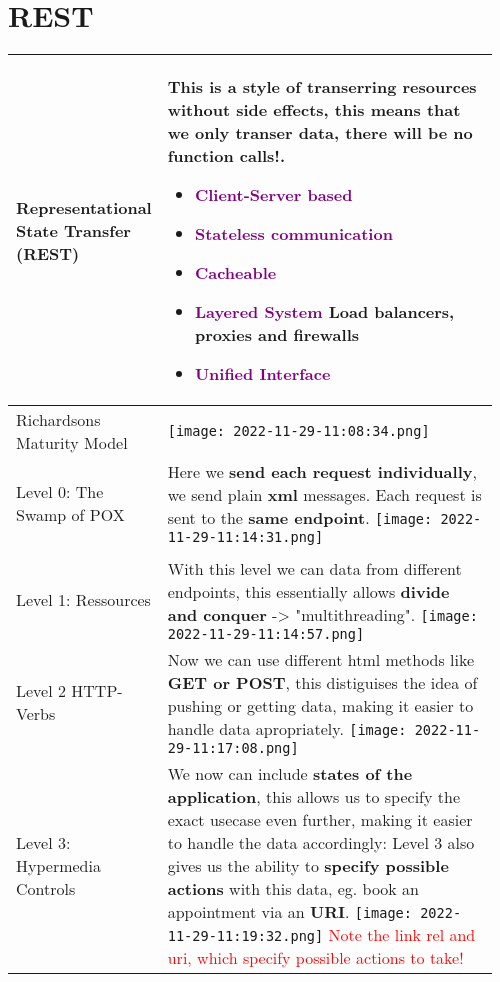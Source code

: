 \documentclass[main.tex,fontsize=8pt,paper=a4,paper=portrait,DIV=calc,]{scrartcl}
\begin{document}
\begin{table}[ht!]
\section{REST}
\begin{tabular}{|m{0.2\linewidth}|m{0.755\linewidth}|}
\hline
Representational State Transfer (REST) & 
This is a style of transerring resources without side effects, this means that \textbf{we only transer data, there will be no function calls!}.\newline
\begin{itemize}
\item \textcolor{purple}{Client-Server based}
\item \textcolor{purple}{Stateless communication}
\item \textcolor{purple}{Cacheable}
\item \textcolor{purple}{Layered System} Load balancers, proxies and firewalls
\item \textcolor{purple}{Unified Interface}
\vspace{-3mm}
\end{itemize} \\
\hline
Richardsons Maturity Model & 
\vspace{2mm}
\texttt{[image: 2022-11-29-11:08:34.png]}\\
\hline
Level 0: The Swamp of POX & 
Here we \textbf{send each request individually}, we send plain \textbf{xml} messages.\newline
Each request is sent to the \textbf{same endpoint}. 
\texttt{[image: 2022-11-29-11:14:31.png]}\\
\\
\hline
Level 1: Ressources & 
With this level we can data from different endpoints, this essentially allows \textbf{divide and conquer} -> "multithreading".\newline 
\texttt{[image: 2022-11-29-11:14:57.png]}\\
\hline
Level 2 HTTP-Verbs & 
Now we can use different html methods like \textbf{GET or POST}, this distiguises the idea of pushing or getting data, making it easier to handle data apropriately. \newline
\texttt{[image: 2022-11-29-11:17:08.png]}\\
\hline
Level 3: Hypermedia Controls & 
We now can include \textbf{states of the application}, this allows us to specify the exact usecase even further, making it easier to handle the data accordingly:\newline
Level 3 also gives us the ability to \textbf{specify possible actions} with this data, eg. book an appointment via an \textbf{URI}.
\texttt{[image: 2022-11-29-11:19:32.png]} \newline
\textcolor{red}{Note the link rel and uri, which specify possible actions to take!}\\
\hline
\end{tabular}
\end{table}
\end{document}
